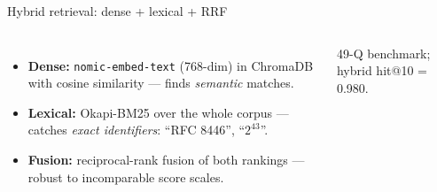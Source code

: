 \documentclass[aspectratio=169]{beamer}
\begin{document}
\begin{frame}{Hybrid retrieval: dense + lexical + RRF}
  \begin{columns}[t, totalwidth=\linewidth]
      \begin{itemize}
        \item \textbf{Dense:} \texttt{nomic-embed-text} (768-dim) in
          ChromaDB with cosine similarity --- finds \emph{semantic}
          matches.\vspace{2mm}
        \item \textbf{Lexical:} Okapi-BM25 over the whole corpus ---
          catches \emph{exact identifiers}: ``RFC 8446'', ``$2^{43}$''.\vspace{2mm}
        \item \textbf{Fusion:} reciprocal-rank fusion of both rankings
          --- robust to incomparable score scales.
      \end{itemize}
      \raggedright
      \vspace{1mm}

      \scriptsize 49-Q benchmark; hybrid hit@10 = 0.980.
  \end{columns}
\end{frame}
\end{document}
